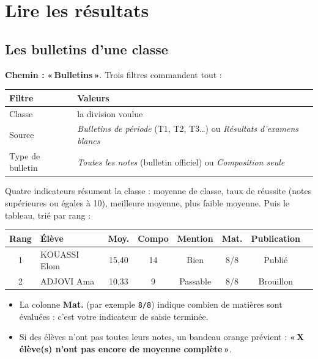 \documentclass[11pt,a4paper]{article}
\newcommand{\menu}[1]{\textbf{«\,#1\,»}}
\begin{document}
\newpage

\section{Lire les résultats}

\subsection{Les bulletins d'une classe}

\textbf{Chemin :} \menu{Bulletins}. Trois filtres commandent tout :

\begin{center}
\renewcommand{\arraystretch}{1.25}
\begin{tabularx}{\textwidth}{@{} >{\raggedright}p{3.2cm} X@{}}
\toprule
\textbf{Filtre} & \textbf{Valeurs} \\
\midrule
Classe & la division voulue \\
Source & \emph{Bulletins de période} (T1, T2, T3…) ou \emph{Résultats d'examens blancs} \\
Type de bulletin & \emph{Toutes les notes} (bulletin officiel) ou \emph{Composition seule} \\
\bottomrule
\end{tabularx}
\end{center}

Quatre indicateurs résument la classe : moyenne de classe, taux de réussite
(notes supérieures ou égales à 10), meilleure moyenne, plus faible moyenne. Puis
le tableau, trié par rang :

\begin{center}
\renewcommand{\arraystretch}{1.25}
\begin{tabular}{@{}clcccccl@{}}
\toprule
\textbf{Rang} & \textbf{Élève} & \textbf{Moy.} & \textbf{Compo} & \textbf{Mention} & \textbf{Mat.} & \textbf{Publication} \\
\midrule
1 & KOUASSI Elom & 15,40 & 14 & Bien & 8/8 & Publié \\
2 & ADJOVI Ama & 10,33 & 9 & Passable & 8/8 & Brouillon \\
\bottomrule
\end{tabular}
\end{center}

\begin{itemize}
  \item La colonne \textbf{Mat.} (par exemple \texttt{8/8}) indique combien de
        matières sont évaluées : c'est votre indicateur de saisie terminée.
  \item Si des élèves n'ont pas toutes leurs notes, un bandeau orange prévient :
        \menu{X élève(s) n'ont pas encore de moyenne complète}.
\end{itemize}
\end{document}
